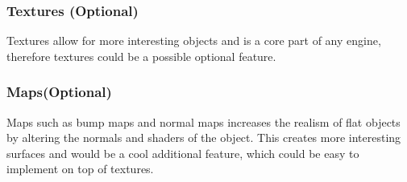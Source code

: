 \subsubsection{Textures (Optional)}
Textures allow for more interesting objects and is a core part of any engine, therefore textures could be a possible optional feature.

\subsubsection{Maps(Optional)}
Maps such as bump maps and normal maps increases the realism of flat objects by altering the normals and shaders of the object. This creates more interesting surfaces and would be a cool additional feature, which could be easy to implement on top of textures.